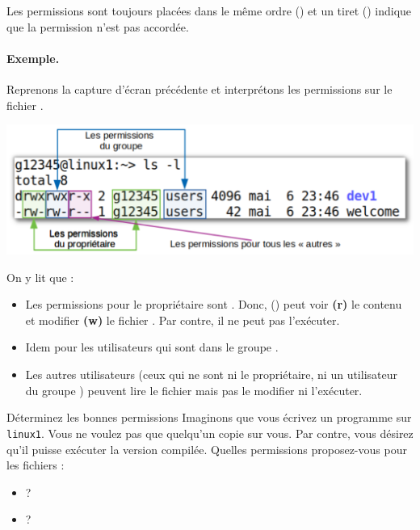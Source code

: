 \documentclass[a4paper,11pt]{style-esi/td}
\begin{document}
		Les permissions sont toujours placées dans le même ordre ()
		et un tiret (\samp{-}) indique que la permission n'est pas accordée.

		\paragraph{Exemple.}
		Reprenons la capture d'écran précédente et interprétons
		les permissions sur le fichier .
		\begin{center}
			\includegraphics[width=.8\textwidth]{image/categorie}
		\end{center}
		On y lit que :
		\begin{itemize}
		\item
			Les permissions pour le propriétaire sont .
			Donc, () 
			peut voir \textbf{(r)} le contenu 
			et modifier \textbf{(w)} le fichier .
			Par contre, il ne peut pas l'exécuter.
		\item 
			Idem pour les utilisateurs qui sont dans le groupe .
		\item 
			Les autres utilisateurs 
			(ceux qui ne sont ni le propriétaire, ni un utilisateur du groupe )
			peuvent lire le fichier mais pas le modifier ni l'exécuter.
		\end{itemize}

		\medskip
		\begin{Exercice}{Déterminez les bonnes permissions}
			Imaginons que vous écrivez un programme  sur \texttt{linux1}.
			Vous ne voulez pas que quelqu'un copie sur vous.
			Par contre, vous désirez qu'il puisse exécuter la version compilée.
			Quelles permissions proposez-vous pour les fichiers :
			\begin{itemize}
			\item {} ? 
				{\tiny
					\textfield{-}\quad
					\textfield{-}\textfield{-}\textfield{-}\quad
					\textfield{-}\textfield{-}\textfield{-}
				}
			\item \samp{.class} ? 
				{\tiny
					\textfield{-}\textfield{-}\quad
					\textfield{-}\textfield{-}\quad
					\textfield{-}\textfield{-}
				}
			\end{itemize}
		\end{Exercice}
\end{document}
